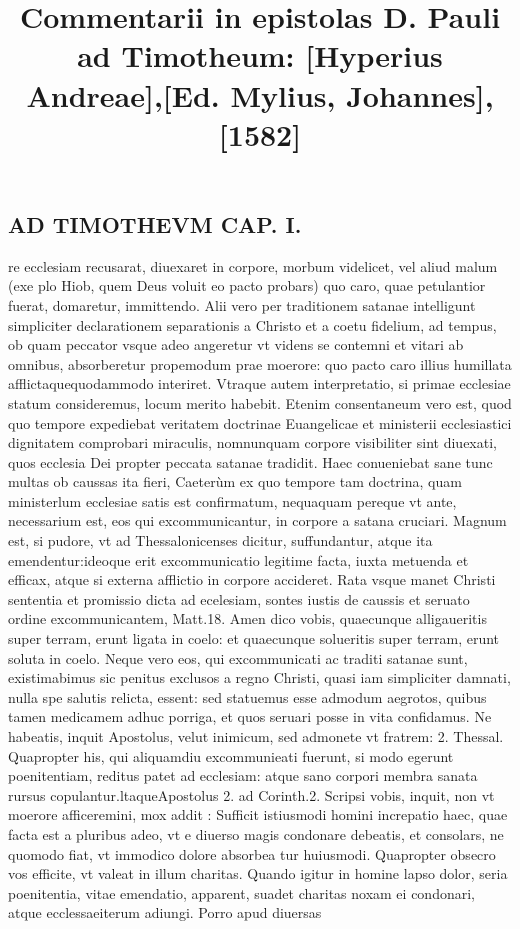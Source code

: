 \documentclass{article}
\begin{document}
\date{}
        \title{Commentarii in epistolas D. Pauli ad Timotheum: [Hyperius Andreae],[Ed. Mylius, Johannes], [1582]}
\maketitle
\tableofcontents
\clearpage
\begin{pages} 
\beginnumbering
        
\section*{AD TIMOTHEVM CAP. I. }
\marginpar{[ p.63 ]}\pstart re ecclesiam recusarat, diuexaret in corpore, morbum videlicet, vel aliud malum (exe plo Hiob, quem Deus voluit eo pacto probars) quo caro, quae petulantior fuerat, domaretur, immittendo. Alii vero per traditionem satanae intelligunt simpliciter declarationem separationis a Christo et a coetu fidelium, ad tempus, ob quam peccator vsque  adeo angeretur vt videns se contemni et vitari ab omnibus, absorberetur propemodum prae moerore: quo pacto caro illius humillata afflictaquequodammodo interiret. Vtraque  autem interpretatio, si primae ecclesiae statum consideremus, locum merito habebit. Etenim consentaneum vero est, quod quo tempore expediebat veritatem doctrinae Euangelicae et ministerii ecclesiastici dignitatem comprobari miraculis, nomnunquam corpore visibiliter sint diuexati, quos ecclesia Dei propter peccata satanae tradidit. Haec conueniebat sane tunc multas ob caussas ita fieri, Caeterùm ex quo tempore tam doctrina, quam ministerlum ecclesiae satis est confirmatum, nequaquam pereque vt ante, necessarium est, eos qui excommunicantur, in corpore a satana cruciari. Magnum est, si pudore, vt ad Thessalonicenses dicitur, suffundantur, atque ita emendentur:ideoque erit excommunicatio legitime facta, iuxta metuenda et efficax, atque si externa afflictio in corpore accideret. Rata vsque  manet Christi sententia et promissio dicta ad ecelesiam, sontes iustis de caussis et seruato ordine excommunicantem, Matt.18. Amen dico vobis, quaecunque  alligaueritis super terram, erunt ligata in coelo: et quaecunque  solueritis super terram, erunt soluta in coelo. Neque  vero eos, qui excommunicati ac traditi satanae sunt, existimabimus sic penitus exclusos a regno Christi, quasi iam simpliciter damnati, nulla spe salutis relicta, essent: sed statuemus esse admodum aegrotos, quibus tamen medicamem adhuc porriga, et quos seruari posse in vita confidamus. Ne habeatis, inquit Apostolus, velut inimicum, sed admonete vt fratrem: 2. Thessal. Quapropter his, qui aliquamdiu excommunieati fuerunt, si modo egerunt poenitentiam, reditus patet ad ecclesiam: atque  sano corpori membra sanata rursus copulantur.ltaqueApostolus 2. ad Corinth.2. Scripsi vobis, inquit, non vt moerore afficeremini, mox addit : Sufficit istiusmodi homini increpatio haec, quae facta est a pluribus  adeo, vt e diuerso magis condonare debeatis, et consolars, ne quomodo fiat, vt immodico dolore absorbea tur huiusmodi. Quapropter obsecro vos efficite, vt valeat in illum charitas. Quando igitur in homine lapso dolor, seria poenitentia, vitae emendatio, apparent, suadet charitas noxam ei condonari, atque  ecclessaeiterum adiungi. Porro apud diuersas 
\end{pages}
\end{document}
